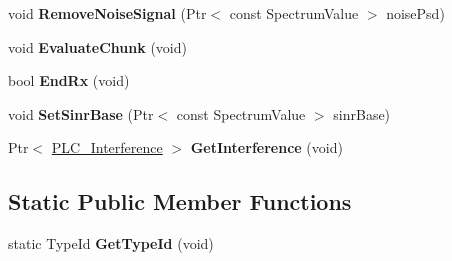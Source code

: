 \begin{DoxyCompactItemize}
\item 
\hypertarget{classns3_1_1PLC__LinkPerformanceModel_a74c5f94e5009cd3437907a1002adafd7}{void {\bfseries \-Remove\-Noise\-Signal} (\-Ptr$<$ const \-Spectrum\-Value $>$ noise\-Psd)}\label{classns3_1_1PLC__LinkPerformanceModel_a74c5f94e5009cd3437907a1002adafd7}

\item 
\hypertarget{classns3_1_1PLC__LinkPerformanceModel_a4177290a3e8a87f3feaf5d5bda4e6d92}{void {\bfseries \-Evaluate\-Chunk} (void)}\label{classns3_1_1PLC__LinkPerformanceModel_a4177290a3e8a87f3feaf5d5bda4e6d92}

\item 
\hypertarget{classns3_1_1PLC__LinkPerformanceModel_a69b682f3a98903861eeec686225f93c6}{bool {\bfseries \-End\-Rx} (void)}\label{classns3_1_1PLC__LinkPerformanceModel_a69b682f3a98903861eeec686225f93c6}

\item 
\hypertarget{classns3_1_1PLC__LinkPerformanceModel_acd64fd0c2c311a04f630d1f1a2c76173}{void {\bfseries \-Set\-Sinr\-Base} (\-Ptr$<$ const \-Spectrum\-Value $>$ sinr\-Base)}\label{classns3_1_1PLC__LinkPerformanceModel_acd64fd0c2c311a04f630d1f1a2c76173}

\item 
\hypertarget{classns3_1_1PLC__LinkPerformanceModel_a8ae427ca85d9e2edb5cfca7d37b808fc}{\-Ptr$<$ \hyperlink{classns3_1_1PLC__Interference}{\-P\-L\-C\-\_\-\-Interference} $>$ {\bfseries \-Get\-Interference} (void)}\label{classns3_1_1PLC__LinkPerformanceModel_a8ae427ca85d9e2edb5cfca7d37b808fc}

\end{DoxyCompactItemize}
\subsection*{\-Static \-Public \-Member \-Functions}
\begin{DoxyCompactItemize}
\item 
\hypertarget{classns3_1_1PLC__LinkPerformanceModel_a915883fff6663f866803318f0daaa066}{static \-Type\-Id {\bfseries \-Get\-Type\-Id} (void)}\label{classns3_1_1PLC__LinkPerformanceModel_a915883fff6663f866803318f0daaa066}

\end{DoxyCompactItemize}
